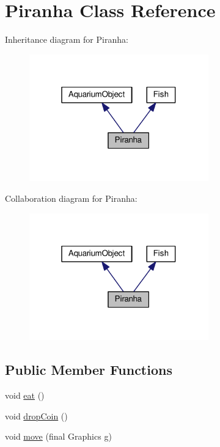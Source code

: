 \hypertarget{class_piranha}{}\section{Piranha Class Reference}
\label{class_piranha}


Inheritance diagram for Piranha\+:
\nopagebreak
\begin{figure}[H]
\begin{center}
\leavevmode
\includegraphics[width=220pt]{class_piranha__inherit__graph}
\end{center}
\end{figure}


Collaboration diagram for Piranha\+:
\nopagebreak
\begin{figure}[H]
\begin{center}
\leavevmode
\includegraphics[width=220pt]{class_piranha__coll__graph}
\end{center}
\end{figure}
\subsection*{Public Member Functions}
\begin{DoxyCompactItemize}
\item 
void \mbox{\hyperlink{class_piranha_ac9bde9a286096cf199bdb1df5434a8c8}{eat}} ()
\item 
void \mbox{\hyperlink{class_piranha_ac7d4af6cc29513e5bd351cbbaf25cc0b}{drop\+Coin}} ()
\item 
void \mbox{\hyperlink{class_piranha_a65ebc6270eb3b1eeaad1c9c0eb53d399}{move}} (final Graphics g)
\end{DoxyCompactItemize}


